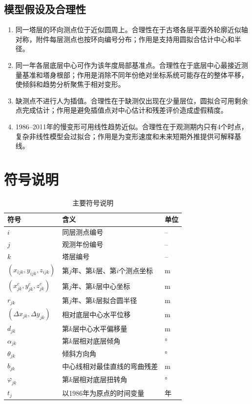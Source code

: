 \documentclass[UTF8,a4paper,12pt]{ctexart}
\begin{document}
\subsection{模型假设及合理性}
\begin{enumerate}[label=\textbf{假设\arabic*：}]
    \item 同一塔层的环向测点位于近似圆周上。合理性在于古塔各层平面外轮廓近似轴对称，附件每层测点也按环向编号分布；作用是支持用圆拟合估计中心和半径。
    \item 同一年各层底层中心可作为该年度局部基准点。合理性在于底层中心最接近测量基准和塔身根部；作用是消除不同年份绝对坐标系统可能存在的整体平移，使倾斜和趋势分析聚焦于相对变形。
    \item 缺测点不进行人为插值。合理性在于缺测仅出现在少量层位，圆拟合可用剩余点完成估计；作用是避免插值点对中心估计和残差评价造成虚假精度。
    \item 1986--2011年的慢变形可用线性趋势近似。合理性在于观测期内只有4个时点，复杂非线性模型会过拟合；作用是为变形速度和未来短期外推提供可解释基线。
\end{enumerate}

\section{符号说明}
\begin{table}[H]
\centering
\caption{主要符号说明}
\begin{tabular}{lll}
\toprule
符号 & 含义 & 单位\\
\midrule
$i$ & 同层测点编号 & --\\
$j$ & 观测年份编号 & --\\
$k$ & 塔层编号 & --\\
$(x_{ijk},y_{ijk},z_{ijk})$ & 第$j$年、第$k$层、第$i$个测点坐标 & m\\
$(x_{jk}^c,y_{jk}^c,z_{jk}^c)$ & 第$j$年、第$k$层中心坐标 & m\\
$r_{jk}$ & 第$j$年、第$k$层拟合圆半径 & m\\
$(\Delta x_{jk},\Delta y_{jk})$ & 相对底层中心水平位移 & m\\
$d_{jk}$ & 第$k$层中心水平偏移量 & m\\
$\alpha_{jk}$ & 第$k$层相对底层倾角 & °\\
$\theta_{jk}$ & 倾斜方向角 & °\\
$b_{jk}$ & 中心线相对最佳直线的弯曲残差 & m\\
$\varphi_{jk}$ & 第$k$层相对底层扭转角 & °\\
$t_j$ & 以1986年为原点的时间变量 & 年\\
\bottomrule
\end{tabular}
\end{table}
\end{document}
